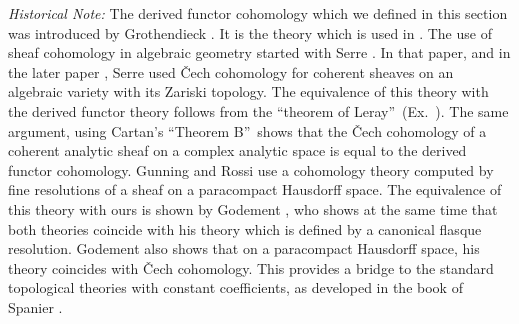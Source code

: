 {\medskip
\emph{Historical Note:} The derived functor cohomology which we defined in this section was introduced by Grothendieck . It is the theory which is used in . The use of sheaf cohomology in algebraic geometry started with Serre . In that paper, and in the later paper , Serre used \v{C}ech cohomology for coherent sheaves on an algebraic variety with its Zariski topology. The equivalence of this theory with the derived functor theory follows from the \textquotedblleft theorem of Leray\textquotedblright\ (Ex.~). The same argument, using Cartan's \textquotedblleft Theorem B\textquotedblright\ shows that the \v{C}ech cohomology of a coherent analytic sheaf on a complex analytic space is equal to the derived functor cohomology. Gunning and Rossi  use a cohomology theory computed by fine resolutions of a sheaf on a paracompact Hausdorff space. The equivalence of this theory with ours is shown by Godement , who shows at the same time that both theories coincide with his theory which is defined by a canonical flasque resolution. Godement also shows  that on a paracompact Hausdorff space, his theory coincides with \v{C}ech cohomology. This provides a bridge to the standard topological theories with constant coefficients, as developed in the book of Spanier . 
}
